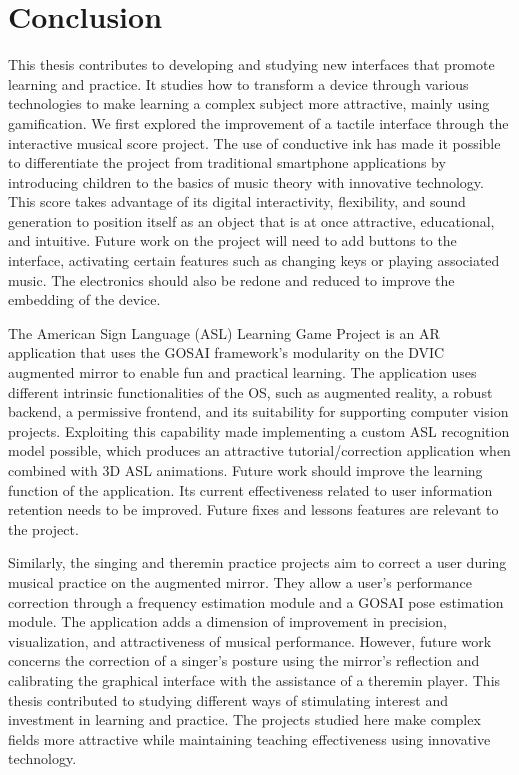 \chapter{Conclusion}
 

This thesis contributes to developing and studying new interfaces that promote learning and practice. It studies how to transform a device through various technologies to make learning a complex subject more attractive, mainly using gamification. We first explored the improvement of a tactile interface through the interactive musical score project. The use of conductive ink has made it possible to differentiate the project from traditional smartphone applications by introducing children to the basics of music theory with innovative technology. This score takes advantage of its digital interactivity, flexibility, and sound generation to position itself as an object that is at once attractive, educational, and intuitive. Future work on the project will need to add buttons to the interface, activating certain features such as changing keys or playing associated music. The electronics should also be redone and reduced to improve the embedding of the device. 

The American Sign Language (ASL) Learning Game Project is an AR application that uses the GOSAI framework's modularity on the DVIC augmented mirror to enable fun and practical learning. The application uses different intrinsic functionalities of the OS, such as augmented reality, a robust backend, a permissive frontend, and its suitability for supporting computer vision projects. Exploiting this capability made implementing a custom ASL recognition model possible, which produces an attractive tutorial/correction application when combined with 3D ASL animations. Future work should improve the learning function of the application. Its current effectiveness related to user information retention needs to be improved. Future fixes and lessons features are relevant to the project. 

Similarly, the singing and theremin practice projects aim to correct a user during musical practice on the augmented mirror. They allow a user's performance correction through a frequency estimation module and a GOSAI pose estimation module. The application adds a dimension of improvement in precision, visualization, and attractiveness of musical performance. However, future work concerns the correction of a singer's posture using the mirror's reflection and calibrating the graphical interface with the assistance of a theremin player. This thesis contributed to studying different ways of stimulating interest and investment in learning and practice. The projects studied here make complex fields more attractive while maintaining teaching effectiveness using innovative technology.


